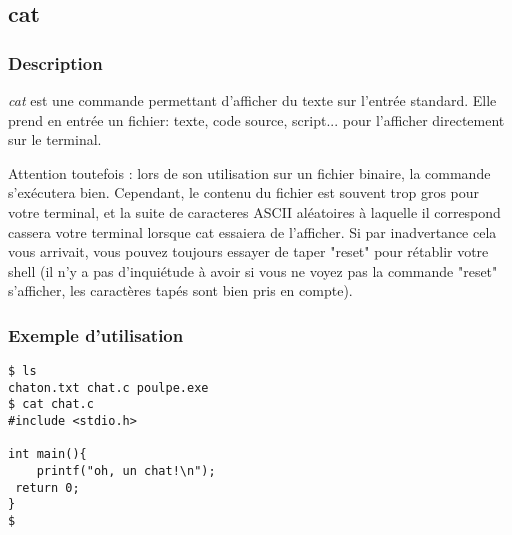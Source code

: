 \subsection*{cat}
\subsubsection*{Description}
\emph{cat} est une commande permettant d'afficher du texte sur l'entrée standard.
Elle prend en entrée un fichier: texte, code source, script... pour l'afficher directement sur le terminal.

Attention toutefois : lors de son utilisation sur un fichier binaire, la commande s'exécutera bien. Cependant, le contenu du fichier est souvent trop gros pour votre terminal, et la suite de caracteres ASCII aléatoires à laquelle il correspond cassera votre terminal lorsque cat essaiera de l'afficher.
Si par inadvertance cela vous arrivait, vous pouvez toujours essayer de taper "reset" pour rétablir votre shell (il n'y a pas d'inquiétude à avoir si vous ne voyez pas la commande "reset" s'afficher, les caractères tapés sont bien pris en compte).


\subsubsection*{Exemple d'utilisation}

\begin{lstlisting}
$ ls
chaton.txt chat.c poulpe.exe
$ cat chat.c
#include <stdio.h>

int main(){
	printf("oh, un chat!\n");
 return 0;
}
$
\end{lstlisting}

